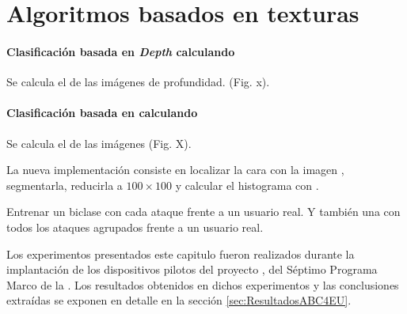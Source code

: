 \section{Algoritmos basados en texturas}\label{sec:PAD_TEXTURAS}

\paragraph{\textbf{Clasificación basada en \textit{Depth} calculando }}

Se calcula el  de las imágenes de profundidad. (Fig. x).


\paragraph{\textbf{Clasificación basada en  calculando }}


Se calcula el  de las imágenes  (Fig. X).

La nueva implementación consiste en localizar la cara con la imagen , segmentarla, reducirla a $100\times100$ y calcular el histograma  con .

Entrenar un  biclase con cada ataque frente a un usuario real. Y también una  con todos los ataques agrupados frente a un usuario real.

\color{black}

Los experimentos presentados este capitulo fueron realizados durante la implantación de los dispositivos pilotos del proyecto  \cite{ABC4EUOnline}, del Séptimo Programa Marco de la . Los resultados obtenidos en dichos experimentos y las conclusiones extraídas se exponen en detalle en la sección \ref{sec:ResultadosABC4EU}. 

